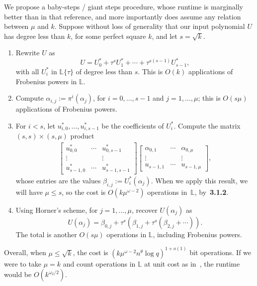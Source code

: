 \documentclass[sigconf]{acmart}
\renewcommand{\L}{\mathbb{L}}
\newcommand{\ang}[1]{\{#1\}}
\begin{document}
We propose a baby-steps / giant steps procedure, whose runtime is
marginally better than in that reference, and more importantly does
assume any relation between $\mu$ and $k$. Suppose without loss of
generality that our input polynomial $U$ has degree less than $k$, for
some perfect square $k$, and let $s=\sqrt{k}$.
\begin{enumerate}
\item Rewrite $U$ as 
$$U = U^*_{0} + \tau^s U^*_{1} + \cdots + \tau^{s(s-1)} U^*_{s-1},$$
  with all $U^*_i$ in $\L\ang{\tau}$ of degree less than $s$.
This is $O(k)$  applications of Frobenius powers in $\L$.
\item Compute $\alpha_{i,j}:=\pi^i(\alpha_j)$, for
  $i=0,\dots,s-1$ and $j=1,\dots,\mu$; this is $O(s \mu)$
applications of Frobenius powers.
\item For $i< s$, let $u^*_{i,0},\dots,u^*_{i,s-1}$ be 
the coefficients of $U^*_i$. Compute the matrix 
$(s,s) \times (s,\mu)$ product
\begin{align*}
\left [ \begin{matrix}
u^*_{0,0} & \cdots & u^*_{0,s-1} \\
\vdots && \vdots \\
u^*_{s-1,0} & \cdots & u^*_{s-1,s-1} 
  \end{matrix} \right ]
\left [ \begin{matrix}
\alpha_{0,1} & \cdots & \alpha_{0,\mu} \\
\vdots && \vdots \\
u_{s-1,1} & \cdots & u_{s-1,\mu} 
  \end{matrix} \right ],
\end{align*}
whose entries are the values $\beta_{i,j}:=U^*_{i}(\alpha_j)$.  When
we apply this result, we will have $\mu \le s$, so the cost is $O(k
\mu^{\omega-2})$ operations in~$\L$, by~{\bf 3.1.2}.

\item Using Horner's scheme, for $j=1,\dots,\mu$, recover $U(\alpha_j)$ as 
$$U(\alpha_j) = \beta_{0,j} + \tau^s( \beta_{1,j} + \tau^s(\beta_{2,j}
  + \cdots )).$$ The total is another $O(s \mu)$ operations
in $\L$, including Frobenius powers.
\end{enumerate}
Overall, when $\mu \le \sqrt{k}$, the cost is $(k \mu^{\omega-2}
n^\theta \log q)^{1+ o(1)}$ bit operations. If we were to take $\mu=k$
and count operations in $\L$ at unit cost as in~\cite{PUCHINGER2017b},
the runtime would be $O(k^{\omega_2/2})$.

\end{document}
